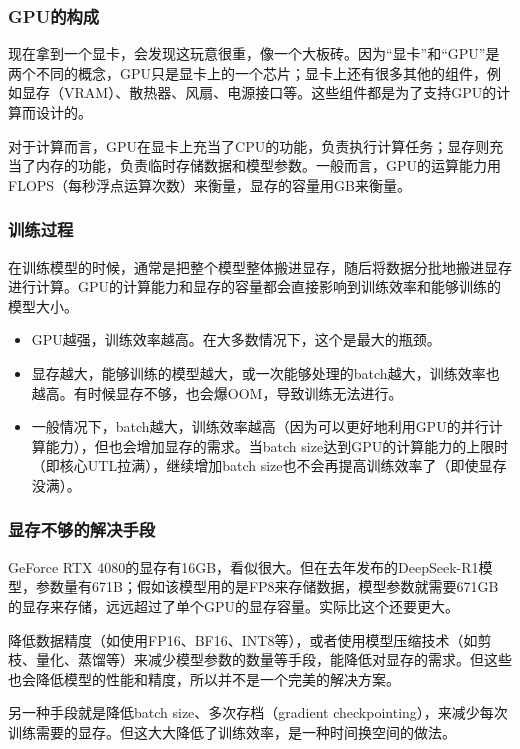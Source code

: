\documentclass{ctexbeamer}
\begin{document}
\begin{frame}
    \frametitle{GPU的构成}

    现在拿到一个显卡，会发现这玩意很重，像一个大板砖。因为“显卡”和“GPU”是两个不同的概念，GPU只是显卡上的一个芯片；显卡上还有很多其他的组件，例如显存（VRAM）、散热器、风扇、电源接口等。这些组件都是为了支持GPU的计算而设计的。

    对于计算而言，GPU在显卡上充当了CPU的功能，负责执行计算任务；显存则充当了内存的功能，负责临时存储数据和模型参数。一般而言，GPU的运算能力用FLOPS（每秒浮点运算次数）来衡量，显存的容量用GB来衡量。

\end{frame}

\begin{frame}
    \frametitle{训练过程}

    在训练模型的时候，通常是把整个模型整体搬进显存，随后将数据分批地搬进显存进行计算。GPU的计算能力和显存的容量都会直接影响到训练效率和能够训练的模型大小。
    \begin{itemize}
        \item GPU越强，训练效率越高。\alert{在大多数情况下，这个是最大的瓶颈。}
        \item 显存越大，能够训练的模型越大，或一次能够处理的batch越大，训练效率也越高。有时候显存不够，也会爆OOM，导致训练无法进行。
        \item 一般情况下，batch越大，训练效率越高（因为可以更好地利用GPU的并行计算能力），但也会增加显存的需求。当batch size达到GPU的计算能力的上限时（即核心UTL拉满），继续增加batch size也不会再提高训练效率了（即使显存没满）。
    \end{itemize}

\end{frame}

\begin{frame}
    \frametitle{显存不够的解决手段}

    GeForce RTX 4080的显存有16GB，看似很大。但在去年发布的DeepSeek-R1模型，参数量有671B；假如该模型用的是FP8来存储数据，模型参数就需要671GB的显存来存储，远远超过了单个GPU的显存容量。实际比这个还要更大。

    降低数据精度（如使用FP16、BF16、INT8等），或者使用模型压缩技术（如剪枝、量化、蒸馏等）来减少模型参数的数量等手段，能降低对显存的需求。但这些也会降低模型的性能和精度，所以并不是一个完美的解决方案。

    另一种手段就是降低batch size、多次存档（gradient checkpointing），来减少每次训练需要的显存。但这大大降低了训练效率，是一种时间换空间的做法。

\end{frame}
\end{document}
